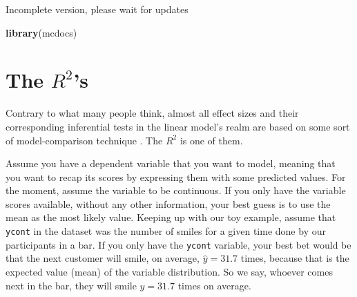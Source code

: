 \documentclass[
]{book}
\newenvironment{Shaded}{\begin{snugshade}}{\end{snugshade}}
\newcommand{\FunctionTok}[1]{\textcolor[rgb]{0.13,0.29,0.53}{\textbf{#1}}}
\newcommand{\NormalTok}[1]{#1}
\begin{document}
{ Incomplete version, please wait for updates }

\hypertarget{appendix-appendix}{%
\appendix}


\begin{Shaded}
\begin{Highlighting}[]
\FunctionTok{library}\NormalTok{(mcdocs)}
\end{Highlighting}
\end{Shaded}

\hypertarget{appendixa}{%
\chapter{\texorpdfstring{The \(R^2\)'s}{The R\^{}2's}}\label{appendixa}}

Contrary to what many people think, almost all effect sizes and their corresponding inferential tests in the linear model's realm are based on some sort of model-comparison technique \citep{judd2017data}. The \(R^2\) is one of them.

Assume you have a dependent variable that you want to model, meaning that you want to recap its scores by expressing them with some predicted values. For the moment, assume the variable to be continuous. If you only have the variable scores available, without any other information, your best guess is to use the mean as the most likely value. Keeping up with our toy example, assume that \texttt{ycont} in the dataset was the number of smiles for a given time done by our participants in a bar. If you only have the \texttt{ycont} variable, your best bet would be that the next customer will smile, on average, \(\hat{y}=31.7\) times, because that is the expected value (mean) of the variable distribution. So we say, whoever comes next in the bar, they will smile \(\hat{y}=31.7\) times on average.
\end{document}
